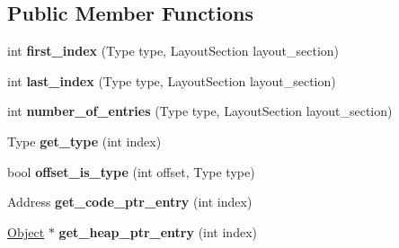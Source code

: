 \subsection*{Public Member Functions}
\begin{DoxyCompactItemize}
\item 
\hypertarget{classv8_1_1internal_1_1_constant_pool_array_abfb9dc91f5b8c7702143d120f732b099}{}int {\bfseries first\+\_\+index} (Type type, Layout\+Section layout\+\_\+section)\label{classv8_1_1internal_1_1_constant_pool_array_abfb9dc91f5b8c7702143d120f732b099}

\item 
\hypertarget{classv8_1_1internal_1_1_constant_pool_array_a8bdac43bbf6e797eb68ee5f513d65243}{}int {\bfseries last\+\_\+index} (Type type, Layout\+Section layout\+\_\+section)\label{classv8_1_1internal_1_1_constant_pool_array_a8bdac43bbf6e797eb68ee5f513d65243}

\item 
\hypertarget{classv8_1_1internal_1_1_constant_pool_array_ac9a39042facc203f9b96bec7151191d1}{}int {\bfseries number\+\_\+of\+\_\+entries} (Type type, Layout\+Section layout\+\_\+section)\label{classv8_1_1internal_1_1_constant_pool_array_ac9a39042facc203f9b96bec7151191d1}

\item 
\hypertarget{classv8_1_1internal_1_1_constant_pool_array_a37bf9e39c608365d2a57ac1e38f4091a}{}Type {\bfseries get\+\_\+type} (int index)\label{classv8_1_1internal_1_1_constant_pool_array_a37bf9e39c608365d2a57ac1e38f4091a}

\item 
\hypertarget{classv8_1_1internal_1_1_constant_pool_array_a3c92490ac6d53e8c0e9d9ea24365d426}{}bool {\bfseries offset\+\_\+is\+\_\+type} (int offset, Type type)\label{classv8_1_1internal_1_1_constant_pool_array_a3c92490ac6d53e8c0e9d9ea24365d426}

\item 
\hypertarget{classv8_1_1internal_1_1_constant_pool_array_a181d29369e2ad7914e612713f85623b2}{}Address {\bfseries get\+\_\+code\+\_\+ptr\+\_\+entry} (int index)\label{classv8_1_1internal_1_1_constant_pool_array_a181d29369e2ad7914e612713f85623b2}

\item 
\hypertarget{classv8_1_1internal_1_1_constant_pool_array_a5d77361c6b0926085fc5521f8d4c4184}{}\hyperlink{classv8_1_1internal_1_1_object}{Object} $\ast$ {\bfseries get\+\_\+heap\+\_\+ptr\+\_\+entry} (int index)\label{classv8_1_1internal_1_1_constant_pool_array_a5d77361c6b0926085fc5521f8d4c4184}


\end{DoxyCompactItemize}
